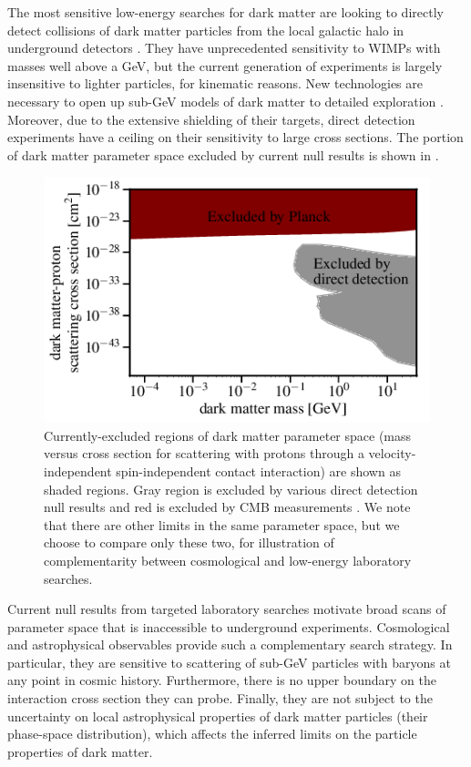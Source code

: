 The most sensitive low-energy searches for dark matter are looking to directly detect collisions of dark matter particles from the local galactic halo in underground detectors \citep{2013arXiv1310.8327C}. 
They have unprecedented sensitivity to WIMPs with masses well above a GeV, but the current generation of experiments is largely insensitive to lighter particles, for kinematic reasons. 
New technologies are necessary to open up sub-GeV models of dark matter to detailed exploration \citep{Battaglieri:2017aum}. 
Moreover, due to the extensive shielding of their targets, direct detection experiments have a ceiling on their sensitivity to large cross sections. 
The portion of dark matter parameter space excluded by current null results is shown in . 
\begin{figure}
\centering
\includegraphics[width=0.6\columnwidth]{figures/planck_dd.png}
\caption{Currently-excluded regions of dark matter parameter space (mass versus cross section for scattering with protons through a velocity-independent spin-independent contact interaction) are shown as shaded regions. Gray region is excluded by various direct detection null results \citep{2018PhRvD..97l3013K} and red is excluded by CMB measurements \citep{Gluscevic:2017ywp}. We note that there are other limits in the same parameter space, but we choose to compare only these two, for illustration of complementarity between cosmological and low-energy laboratory searches.}
\label{fig:dd}
\end{figure}

Current null results from targeted laboratory searches motivate broad scans of parameter space that is inaccessible to underground experiments. Cosmological and astrophysical observables provide such a complementary search strategy. In particular, they are sensitive to scattering of sub-GeV particles with baryons at any point in cosmic history. Furthermore, there is no upper boundary on the interaction cross section they can probe. Finally, they are not subject to the uncertainty on local astrophysical properties of dark matter particles (their phase-space distribution), which affects the inferred limits on the particle properties of dark matter. 

